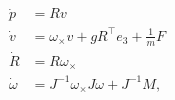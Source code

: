 \documentclass[preview]{standalone}
\begin{document}
\begin{centering}


\begin{align}
\dot{p} &= {R} v \\	
\dot{v} &= \omega_\times v + gR^\top e_3 + \frac{1}{m}F \\
\dot{R} &= R\omega_\times \\
\dot{\omega} &= J^{-1}\omega_\times J \omega + J^{-1}M,
\end{align}

\end{centering}
\end{document}
